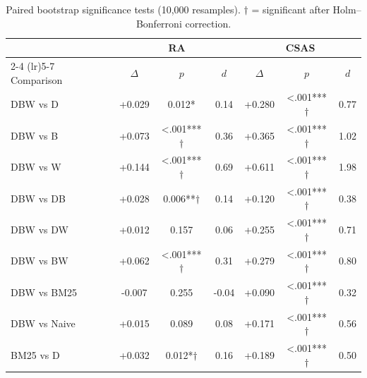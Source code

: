 \begin{table}[t]
\caption{Paired bootstrap significance tests (10{,}000 resamples). $\dagger$ = significant after Holm--Bonferroni correction.}
\label{tab:significance}
\centering
\small
\begin{tabular}{lcccccc}
\toprule
& \multicolumn{3}{c}{RA} & \multicolumn{3}{c}{CSAS} \\
\cmidrule(lr){2-4} \cmidrule(lr){5-7}
Comparison & $\Delta$ & $p$ & $d$ & $\Delta$ & $p$ & $d$ \\
\midrule
DBW vs D & +0.029 & 0.012* & 0.14 & +0.280 & <.001***$\dagger$ & 0.77 \\
DBW vs B & +0.073 & <.001***$\dagger$ & 0.36 & +0.365 & <.001***$\dagger$ & 1.02 \\
DBW vs W & +0.144 & <.001***$\dagger$ & 0.69 & +0.611 & <.001***$\dagger$ & 1.98 \\
DBW vs DB & +0.028 & 0.006**$\dagger$ & 0.14 & +0.120 & <.001***$\dagger$ & 0.38 \\
DBW vs DW & +0.012 & 0.157 & 0.06 & +0.255 & <.001***$\dagger$ & 0.71 \\
DBW vs BW & +0.062 & <.001***$\dagger$ & 0.31 & +0.279 & <.001***$\dagger$ & 0.80 \\
DBW vs BM25 & -0.007 & 0.255 & -0.04 & +0.090 & <.001***$\dagger$ & 0.32 \\
DBW vs Naive & +0.015 & 0.089 & 0.08 & +0.171 & <.001***$\dagger$ & 0.56 \\
BM25 vs D & +0.032 & 0.012*$\dagger$ & 0.16 & +0.189 & <.001***$\dagger$ & 0.50 \\
\bottomrule
\end{tabular}
\end{table}